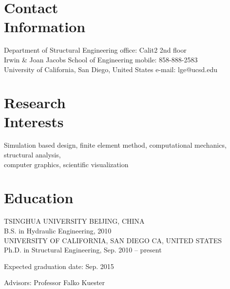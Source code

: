 \documentclass[margin,line]{cv}
\begin{document}
\begin{resume}
	\section{\mysidestyle Contact\\Information}
	Department of Structural Engineering \hfill office: Calit2 2nd floor
	\vspace{0mm}\\\vspace{0mm}%
	Irwin \& Joan Jacobs School of Engineering \hfill mobile: 858-888-2583
	\vspace{0mm}\\\vspace{0mm}%
	University of California, San Diego, United States \hfill e-mail: lge@ucsd.edu
	\vspace{0mm}\\\vspace{-4.5mm}%

	\section{\mysidestyle Research\\Interests}

	Simulation based design, finite element method, computational mechanics, structural analysis, \\
	computer graphics, scientific visualization

	\section{\mysidestyle Education}
	TSINGHUA UNIVERSITY \hfill BEIJING, CHINA
	\vspace{1mm}\\\vspace{1mm}%
	B.S. in Hydraulic Engineering, 2010
	\vspace{3mm}\\%
	UNIVERSITY OF CALIFORNIA, SAN DIEGO \hfill CA, UNITED STATES
	\vspace{1mm}\\\vspace{1mm}%
	Ph.D. in Structural Engineering, Sep. 2010 -- present
	\vspace{-3mm}\\\vspace{-1mm}%
	\begin{list2}
		\item Expected graduation date:  Sep. 2015
		\item Advisors:  Professor Falko Kuester
	\end{list2}


\end{resume}
\end{document}
